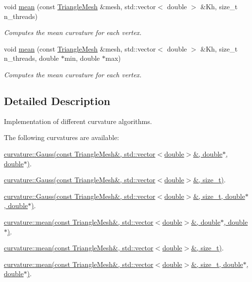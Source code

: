 \begin{DoxyCompactItemize}
void \hyperlink{namespacegeoproc_1_1curvature_a4d1846571b144ee15bd828156bd5f256}{mean} (const \hyperlink{classgeoproc_1_1TriangleMesh}{Triangle\+Mesh} \&mesh, std\+::vector$<$ double $>$ \&Kh, size\+\_\+t n\+\_\+threads)
\begin{DoxyCompactList}\small\item\em Computes the mean curvature for each vertex. \end{DoxyCompactList}\item 
void \hyperlink{namespacegeoproc_1_1curvature_ae649b189f6b14d3dd42fcace8a0e804a}{mean} (const \hyperlink{classgeoproc_1_1TriangleMesh}{Triangle\+Mesh} \&mesh, std\+::vector$<$ double $>$ \&Kh, size\+\_\+t n\+\_\+threads, double $\ast$min, double $\ast$max)
\begin{DoxyCompactList}\small\item\em Computes the mean curvature for each vertex. \end{DoxyCompactList}\end{DoxyCompactItemize}


\subsection{Detailed Description}
Implementation of different curvature algorithms. 

The following curvatures are available\+:
\begin{DoxyItemize}
\item \hyperlink{namespacegeoproc_1_1curvature_ac05fe4b3f804678c768241f17f52bb9a}{curvature\+::\+Gauss(const Triangle\+Mesh\&, std\+::vector$<$double$>$\&, double$\ast$, double$\ast$)}.
\item \hyperlink{namespacegeoproc_1_1curvature_a769aa493a6028dbd553b6e40711662f8}{curvature\+::\+Gauss(const Triangle\+Mesh\&, std\+::vector$<$double$>$\&, size\+\_\+t)}.
\item \hyperlink{namespacegeoproc_1_1curvature_a76b1a28725ce587aec2b5a5d452fb019}{curvature\+::\+Gauss(const Triangle\+Mesh\&, std\+::vector$<$double$>$\&, size\+\_\+t, double$\ast$, double$\ast$)}.
\item \hyperlink{namespacegeoproc_1_1curvature_a9ccfeae3d3672f6627f4de90bd8ffb0c}{curvature\+::mean(const Triangle\+Mesh\&, std\+::vector$<$double$>$\&, double$\ast$, double$\ast$)}.
\item \hyperlink{namespacegeoproc_1_1curvature_a4d1846571b144ee15bd828156bd5f256}{curvature\+::mean(const Triangle\+Mesh\&, std\+::vector$<$double$>$\&, size\+\_\+t)}.
\item \hyperlink{namespacegeoproc_1_1curvature_ae649b189f6b14d3dd42fcace8a0e804a}{curvature\+::mean(const Triangle\+Mesh\&, std\+::vector$<$double$>$\&, size\+\_\+t, double$\ast$, double$\ast$)}. 
\end{DoxyItemize}

